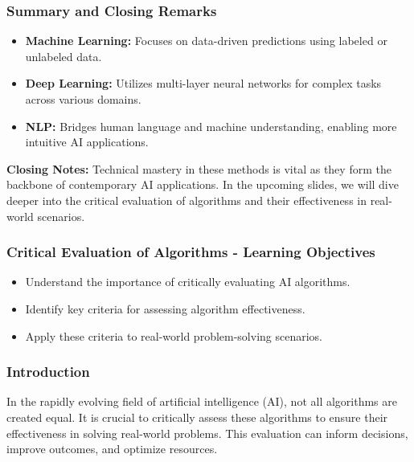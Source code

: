 \documentclass[aspectratio=169]{beamer}
\begin{document}
\begin{frame}[fragile]
    \frametitle{Summary and Closing Remarks}
    \begin{itemize}
        \item \textbf{Machine Learning:} Focuses on data-driven predictions using labeled or unlabeled data.
        \item \textbf{Deep Learning:} Utilizes multi-layer neural networks for complex tasks across various domains.
        \item \textbf{NLP:} Bridges human language and machine understanding, enabling more intuitive AI applications.
    \end{itemize}
    
    \textbf{Closing Notes:} 
    Technical mastery in these methods is vital as they form the backbone of contemporary AI applications. In the upcoming slides, we will dive deeper into the critical evaluation of algorithms and their effectiveness in real-world scenarios.
\end{frame}

\begin{frame}[fragile]
    \frametitle{Critical Evaluation of Algorithms - Learning Objectives}
    \begin{itemize}
        \item Understand the importance of critically evaluating AI algorithms.
        \item Identify key criteria for assessing algorithm effectiveness.
        \item Apply these criteria to real-world problem-solving scenarios.
    \end{itemize}
\end{frame}

\begin{frame}[fragile]
    \frametitle{Introduction}
    In the rapidly evolving field of artificial intelligence (AI), not all algorithms are created equal. 
    It is crucial to critically assess these algorithms to ensure their effectiveness in solving real-world problems. 
    This evaluation can inform decisions, improve outcomes, and optimize resources.
\end{frame}
\end{document}

